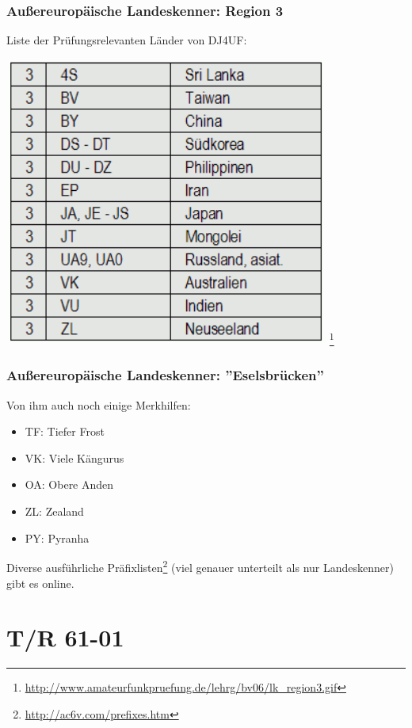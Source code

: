 \begin{frame}
    \frametitle{Außereuropäische Landeskenner: Region 3}

    Liste der Prüfungsrelevanten Länder von DJ4UF:

    \begin{center}
        \includegraphics[width=0.8\textwidth]{bv06/lk_region3.png}
        \footnote{\tiny \url{http://www.amateurfunkpruefung.de/lehrg/bv06/lk_region3.gif}}
    \end{center}

\end{frame}

\begin{frame}
    \frametitle{Außereuropäische Landeskenner: ''Eselsbrücken''}

    Von ihm auch noch einige Merkhilfen:

    \footnotesize
    \begin{itemize}
        \item TF: Tiefer Frost
        \item VK: Viele Kängurus
        \item OA: Obere Anden
        \item ZL: Zealand
        \item PY: Pyranha
    \end{itemize}

    Diverse ausführliche Präfixlisten\footnote{\url{http://ac6v.com/prefixes.htm}}
    (viel genauer unterteilt als nur Landeskenner) gibt es online.

\end{frame}

\section{T/R 61-01}

